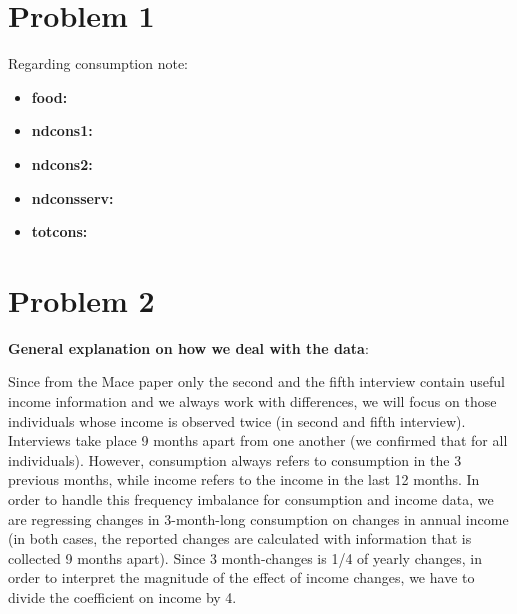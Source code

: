 \documentclass[12pt,a4paper]{article}
\begin{document}
\newpage


\section*{Problem 1}

Regarding consumption note:
\begin{itemize}
    \item \textbf{food:} 
    \item \textbf{ndcons1:} 
    \item \textbf{ndcons2:} 
    \item \textbf{ndconsserv:} 
    \item \textbf{totcons:} 
\end{itemize}


\section*{Problem 2}

\textbf{General explanation on how we deal with the data}:

Since from the Mace paper only the second and the fifth interview contain useful income information and we always work with differences, we will focus on those individuals whose income is observed twice (in second and fifth interview). \\

Interviews take place 9 months apart from one another (we confirmed that for all individuals). However, consumption always refers to consumption in the 3 previous months, while income refers to the income in the last 12 months. In order to handle this frequency imbalance for consumption and income data, we are regressing changes in 3-month-long consumption on changes in annual income (in both cases, the reported changes are calculated with information that is collected 9 months apart). Since 3 month-changes is 1/4 of yearly changes, in order to interpret the magnitude of the effect of income changes, we have to divide the coefficient on income by 4.\\
\end{document}
